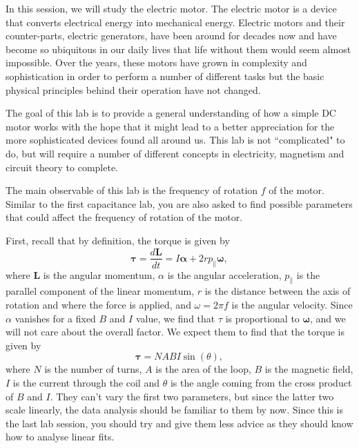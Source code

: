 \documentclass[12pt]{report}
\begin{document}
In this session, we will study the electric motor. The electric motor is a device that converts electrical energy into mechanical energy. Electric motors and their counter-parts, electric generators, have been around for decades now and have become so ubiquitous in our daily lives that life without them would seem almost impossible. Over the years, these motors have grown in complexity and sophistication in order to perform a number of different tasks but the basic physical principles behind their operation have not changed.

The goal of this lab is to provide a general understanding of how a simple DC motor works with the hope that it might lead to a better appreciation for the more sophisticated devices found all around us. This lab is not ``complicated" to do, but will require a number of different concepts in electricity, magnetism and circuit theory to complete.

The main observable of this lab is the frequency of rotation $f$ of the motor. Similar to the first capacitance lab, you are also asked to find possible parameters that could affect the frequency of rotation of the motor.

\begin{tcolorbox}
First, recall that by definition, the torque is given by
\begin{equation}
\bm{\tau} = \frac{d \bm{L}}{dt} = I \bm{\alpha} + 2r p_{\parallel} \bm{\omega},
\end{equation}
where $\bm{L}$ is the angular momentum, $\alpha$ is the angular acceleration, $p_{\parallel}$ is the parallel component of the linear momentum, $r$ is the distance between the axis of rotation and where the force is applied, and $\omega=2\pi f$ is the angular velocity.
Since $\alpha$ vanishes for a fixed $B$ and $I$ value, we find that $\tau$ is proportional to $\bm{\omega}$, and we will not care about the overall factor.
We expect them to find that the torque is given by
\begin{equation}
\bm{\tau} = N A B I \sin(\theta),
\end{equation}
where $N$ is the number of turns, $A$ is the area of the loop, $B$ is the magnetic field, $I$ is the current through the coil and $\theta$ is the angle coming from the cross product of $B$ and $I$. They can't vary the first two parameters, but since the latter two scale linearly, the data analysis should be familiar to them by now.
Since this is the last lab session, you should try and give them less advice as they should know how to analyse linear fits.
\end{tcolorbox}
\end{document}

